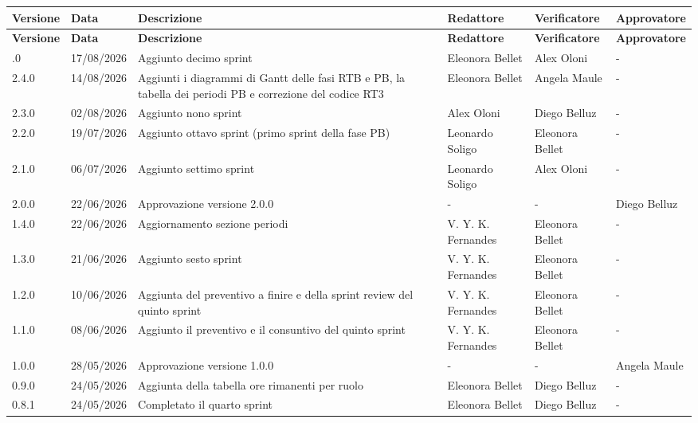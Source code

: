 \documentclass[a4paper,12pt]{article}
\begin{document}
\setlength{\tabcolsep}{3pt} 
\footnotesize
\begin{longtable}{|l|l|p{4.5cm}|p{2cm}|p{2.5cm}|p{2.5cm}|}
    \hline
    \rowcolor{gray!20}
    \textbf{Versione} & \textbf{Data} & \textbf{Descrizione} & \textbf{Redattore} & \textbf{Verificatore} & \textbf{Approvatore} \\
    \hline
    \endfirsthead 
    \hline
    \rowcolor{gray!20}
    \textbf{Versione} & \textbf{Data} & \textbf{Descrizione} & \textbf{Redattore} & \textbf{Verificatore} & \textbf{Approvatore} \\
    \hline
    \endhead
    \endfoot
    \endlastfoot
    2.5.0 & 17/08/2026 & Aggiunto decimo sprint & Eleonora Bellet & Alex Oloni & - \\ \hline
    2.4.0 & 14/08/2026 & Aggiunti i diagrammi di Gantt delle fasi RTB e PB, la tabella dei periodi PB e correzione del codice RT3 & Eleonora Bellet & Angela Maule & - \\ \hline
    2.3.0 & 02/08/2026 & Aggiunto nono sprint & Alex Oloni & Diego Belluz & - \\ \hline
    2.2.0 & 19/07/2026 & Aggiunto ottavo sprint (primo sprint della fase PB) & Leonardo Soligo & Eleonora Bellet & - \\ \hline
    2.1.0 & 06/07/2026 & Aggiunto settimo sprint & Leonardo Soligo & Alex Oloni & - \\ \hline
    2.0.0 & 22/06/2026 & Approvazione versione 2.0.0 & - & - & Diego Belluz \\ \hline
    1.4.0 & 22/06/2026 & Aggiornamento sezione periodi & V. Y. K. Fernandes & Eleonora Bellet & - \\ \hline
    1.3.0 & 21/06/2026 & Aggiunto sesto sprint & V. Y. K. Fernandes & Eleonora Bellet & - \\ \hline
    1.2.0 & 10/06/2026 & Aggiunta del preventivo a finire e della sprint review del quinto sprint & V. Y. K. Fernandes & Eleonora Bellet & - \\ \hline
    1.1.0 & 08/06/2026 & Aggiunto il preventivo e il consuntivo del quinto sprint & V. Y. K. Fernandes & Eleonora Bellet & - \\ \hline
    1.0.0 & 28/05/2026 & Approvazione versione 1.0.0 & - & - & Angela Maule \\ \hline
    0.9.0 & 24/05/2026 & Aggiunta della tabella ore rimanenti per ruolo & Eleonora Bellet & Diego Belluz & - \\ \hline
    0.8.1 & 24/05/2026 & Completato il quarto sprint & Eleonora Bellet & Diego Belluz & - \\ \hline

\end{longtable}
\end{document}
